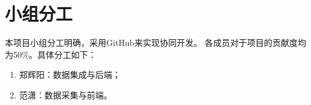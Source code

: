 \section{小组分工}
本项目小组分工明确，采用GitHub来实现协同开发。
各成员对于项目的贡献度均为50\%。具体分工如下：

\begin{enumerate}
    \item 郑辉阳：数据集成与后端；
    \item 范潇：数据采集与前端。
\end{enumerate}